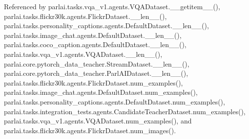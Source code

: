 Referenced by parlai.\+tasks.\+vqa\+\_\+v1.\+agents.\+V\+Q\+A\+Dataset.\+\_\+\+\_\+getitem\+\_\+\+\_\+(), parlai.\+tasks.\+flickr30k.\+agents.\+Flickr\+Dataset.\+\_\+\+\_\+len\+\_\+\+\_\+(), parlai.\+tasks.\+personality\+\_\+captions.\+agents.\+Default\+Dataset.\+\_\+\+\_\+len\+\_\+\+\_\+(), parlai.\+tasks.\+image\+\_\+chat.\+agents.\+Default\+Dataset.\+\_\+\+\_\+len\+\_\+\+\_\+(), parlai.\+tasks.\+coco\+\_\+caption.\+agents.\+Default\+Dataset.\+\_\+\+\_\+len\+\_\+\+\_\+(), parlai.\+tasks.\+vqa\+\_\+v1.\+agents.\+V\+Q\+A\+Dataset.\+\_\+\+\_\+len\+\_\+\+\_\+(), parlai.\+core.\+pytorch\+\_\+data\+\_\+teacher.\+Stream\+Dataset.\+\_\+\+\_\+len\+\_\+\+\_\+(), parlai.\+core.\+pytorch\+\_\+data\+\_\+teacher.\+Parl\+A\+I\+Dataset.\+\_\+\+\_\+len\+\_\+\+\_\+(), parlai.\+tasks.\+flickr30k.\+agents.\+Flickr\+Dataset.\+num\+\_\+examples(), parlai.\+tasks.\+image\+\_\+chat.\+agents.\+Default\+Dataset.\+num\+\_\+examples(), parlai.\+tasks.\+personality\+\_\+captions.\+agents.\+Default\+Dataset.\+num\+\_\+examples(), parlai.\+tasks.\+integration\+\_\+tests.\+agents.\+Candidate\+Teacher\+Dataset.\+num\+\_\+examples(), parlai.\+tasks.\+vqa\+\_\+v1.\+agents.\+V\+Q\+A\+Dataset.\+num\+\_\+examples(), and parlai.\+tasks.\+flickr30k.\+agents.\+Flickr\+Dataset.\+num\+\_\+images().

